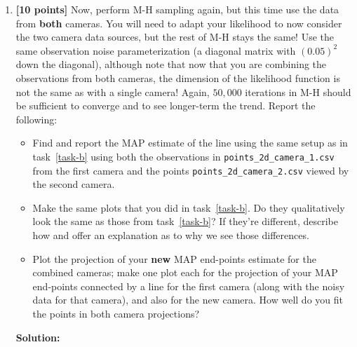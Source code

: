 \documentclass[10pt]{article}
\begin{document}
\begin{enumerate}
\item {\bf [10 points]} \label{task-f} Now, perform M-H sampling again, but this time use the data from {\bf both} cameras.  You will need to adapt your likelihood to now consider the two camera data sources, but the rest of M-H stays the same!  Use the same observation noise parameterization (a diagonal matrix with $(0.05)^2$ down the diagonal), although note that now that you are combining the observations from both cameras, the dimension of the likelihood function is not the same as with a single camera!  Again, $50,000$ iterations in M-H should be sufficient to converge and to see longer-term the trend.
Report the following:
\begin{itemize}
\item Find and report the MAP estimate of the line using the same setup as in task~\ref{task-b} using both the observations in {\tt points\_2d\_camera\_1.csv} from the first camera and the points {\tt points\_2d\_camera\_2.csv} viewed by the second camera.


\item Make the same plots that you did in task~\ref{task-b}.  Do they qualitatively look the same as those from task~\ref{task-b}?  If they're different, describe how and offer an explanation as to why we see those differences.


\item Plot the projection of your {\bf new} MAP end-points estimate for the combined cameras; make one plot each for the projection of your MAP end-points connected by a line for the first camera (along with the noisy data for that camera), and also for the new camera.  How well do you fit the points in both camera projections?


\end{itemize}

\textbf{Solution:}


\end{enumerate}
\end{document}
